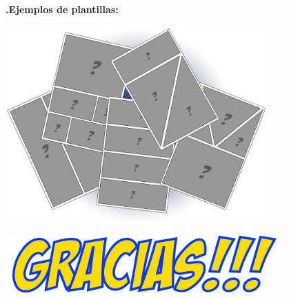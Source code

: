 \documentclass[utf8]{beamer}
\begin{document}
	\begin{frame}
		\textbf{
			\newline
			\newline
			.\hspace{1cm}Ejemplos de plantillas:
		}
		\begin{center} 
			\includegraphics[width=0.75\textwidth]{plantillas.jpg}
		\end{center}
	\end{frame}
	\begin{frame}
		\begin{center} 
			 \includegraphics[width=0.8\textwidth]{gracias.jpg}
		\end{center}
	\end{frame}
\end{document}

